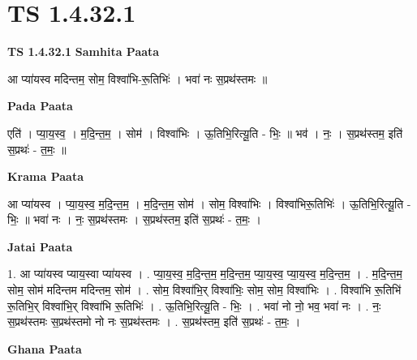\documentclass[17pt]{extarticle}
\begin{document}
\section*{ TS 1.4.32.1 }

\textbf{TS 1.4.32.1 } \newline
\textbf{Samhita Paata} \newline

आ प्या॑यस्व मदिन्तम॒ सोम॒ विश्वा॑भि-रू॒तिभिः॑ । भवा॑ नः स॒प्रथ॑स्तमः ॥ \newline

\textbf{Pada Paata} \newline

एति॑ । प्या॒य॒स्व॒ । म॒दि॒न्त॒म॒ । सोम॑ । विश्वा॑भिः । ऊ॒तिभि॒रित्यू॒ति - भिः॒ ॥ भव॑ । नः॒ । स॒प्रथ॑स्तम॒ इति॑ स॒प्रथः॑ - त॒मः॒ ॥  \newline


\textbf{Krama Paata} \newline

आ प्या॑यस्व । प्या॒य॒स्व॒ म॒दि॒न्त॒म॒ । म॒दि॒न्त॒म॒ सोम॑ । सोम॒ विश्वा॑भिः । विश्वा॑भिरू॒तिभिः॑ । ऊ॒तिभि॒रित्यू॒ति - भिः॒ ॥ भवा॑ नः । नः॒ स॒प्रथ॑स्तमः । स॒प्रथ॑स्तम॒ इति॑ स॒प्रथः॑ - त॒मः॒ । \newline

\textbf{Jatai Paata} \newline

1. आ प्या॑यस्व प्याय॒स्वा प्या॑यस्व । . प्या॒य॒स्व॒ म॒दि॒न्त॒म॒ म॒दि॒न्त॒म॒ प्या॒य॒स्व॒ प्या॒य॒स्व॒ म॒दि॒न्त॒म॒ । . म॒दि॒न्त॒म॒ सोम॒ सोम॑ मदिन्तम मदिन्तम॒ सोम॑ । . सोम॒ विश्वा॑भि॒र् विश्वा॑भिः॒ सोम॒ सोम॒ विश्वा॑भिः । . विश्वा॑भि रू॒तिभि॑ रू॒तिभि॒र् विश्वा॑भि॒र् विश्वा॑भि रू॒तिभिः॑ । . ऊ॒तिभि॒रित्यू॒ति - भिः॒ । . भवा॑ नो नो॒ भव॒ भवा॑ नः । . नः॒ स॒प्रथ॑स्तमः स॒प्रथ॑स्तमो नो नः स॒प्रथ॑स्तमः । . स॒प्रथ॑स्तम॒ इति॑ स॒प्रथः॑ - त॒मः॒ । \newline

\textbf{Ghana Paata } \newline
\end{document}
